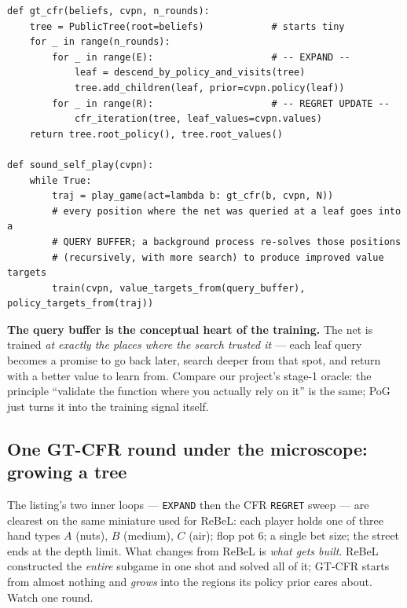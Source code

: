 \documentclass[11pt,a4paper]{article}
\begin{document}
\begin{lstlisting}[style=py, caption={GT-CFR and sound self-play (schematic).}]
def gt_cfr(beliefs, cvpn, n_rounds):
    tree = PublicTree(root=beliefs)            # starts tiny
    for _ in range(n_rounds):
        for _ in range(E):                     # -- EXPAND --
            leaf = descend_by_policy_and_visits(tree)
            tree.add_children(leaf, prior=cvpn.policy(leaf))
        for _ in range(R):                     # -- REGRET UPDATE --
            cfr_iteration(tree, leaf_values=cvpn.values)
    return tree.root_policy(), tree.root_values()

def sound_self_play(cvpn):
    while True:
        traj = play_game(act=lambda b: gt_cfr(b, cvpn, N))
        # every position where the net was queried at a leaf goes into a
        # QUERY BUFFER; a background process re-solves those positions
        # (recursively, with more search) to produce improved value targets
        train(cvpn, value_targets_from(query_buffer), policy_targets_from(traj))
\end{lstlisting}

\begin{intuition}
\textbf{The query buffer is the conceptual heart of the training.} The net is
trained \emph{at exactly the places where the search trusted it} --- each leaf
query becomes a promise to go back later, search deeper from that spot, and
return with a better value to learn from. Compare our project's stage-1 oracle:
the principle ``validate the function where you actually rely on it'' is the
same; PoG just turns it into the training signal itself.
\end{intuition}

\subsection{One GT-CFR round under the microscope: growing a tree}

The listing's two inner loops --- \texttt{EXPAND} then the CFR \texttt{REGRET}
sweep --- are clearest on the same miniature used for ReBeL: each player holds
one of three hand types $A$ (nuts), $B$ (medium), $C$ (air); flop pot 6; a single
bet size; the street ends at the depth limit. What changes from ReBeL is
\emph{what gets built}. ReBeL constructed the \emph{entire} subgame in one shot
and solved all of it; GT-CFR starts from almost nothing and \emph{grows} into the
regions its policy prior cares about. Watch one round.
\end{document}
